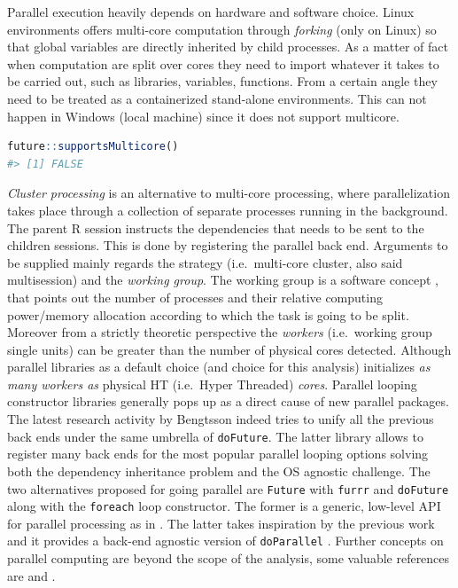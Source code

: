 \documentclass[
  12pt,
  a4paper,
  oneside]{book}
\newcommand{\passthrough}[1]{#1}
\theoremstyle{definition}
\theoremstyle{definition}
\theoremstyle{definition}
\theoremstyle{remark}
\begin{document}
Parallel execution heavily depends on hardware and software choice. Linux environments offers multi-core computation through \emph{forking} \citep{wiki:forking} (only on Linux) so that global variables are directly inherited by child processes. As a matter of fact when computation are split over cores they need to import whatever it takes to be carried out, such as libraries, variables, functions. From a certain angle they need to be treated as a containerized stand-alone environments. This can not happen in Windows (local machine) since it does not support multicore.

\begin{lstlisting}[language=R]
future::supportsMulticore()
#> [1] FALSE
\end{lstlisting}

\emph{Cluster processing} is an alternative to multi-core processing, where parallelization takes place through a collection of separate processes running in the background. The parent R session instructs the dependencies that needs to be sent to the children sessions.
This is done by registering the parallel back end. Arguments to be supplied mainly regards the strategy (i.e.~multi-core cluster, also said multisession) and the \emph{working group}. The working group is a software concept \citep{parallelr}, that points out the number of processes and their relative computing power/memory allocation according to which the task is going to be split. Moreover from a strictly theoretic perspective the \emph{workers} (i.e.~working group single units) can be greater than the number of physical cores detected. Although parallel libraries as a default choice (and choice for this analysis) initializes \emph{as many workers as} physical HT (i.e.~Hyper Threaded) \emph{cores}.
Parallel looping constructor libraries generally pops up as a direct cause of new parallel packages. The latest research activity by Bengtsson \citet{doFuture} indeed tries to unify all the previous back ends under the same umbrella of \passthrough{\lstinline!doFuture!}. The latter library allows to register many back ends for the most popular parallel looping options solving both the dependency inheritance problem and the OS agnostic challenge.
The two alternatives proposed for going parallel are \passthrough{\lstinline!Future!} \citet{future} with \passthrough{\lstinline!furrr!} \citet{furrr} and \passthrough{\lstinline!doFuture!} \citeyearpar{doFuture} along with the \passthrough{\lstinline!foreach!} \citet{foreach} loop constructor. The former is a generic, low-level API for parallel processing as in \citet{bengtsson_2017}. The latter takes inspiration by the previous work and it provides a back-end agnostic version of \passthrough{\lstinline!doParallel!} \citet{doParallel}. Further concepts on parallel computing are beyond the scope of the analysis, some valuable references are \citet{barney} and \citet{parallelr}.
\end{document}
